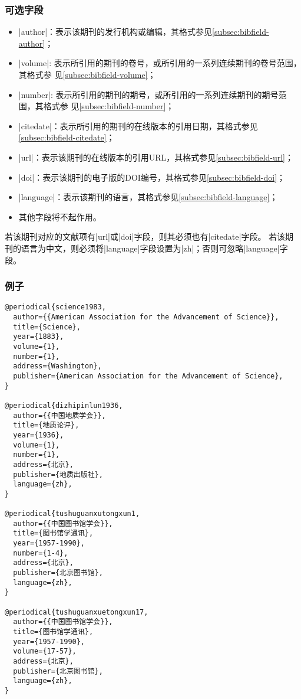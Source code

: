 \subsubsection{可选字段}

\begin{itemize}
\item |author|：表示该期刊的发行机构或编辑，其格式参见\ref{subsec:bibfield-author}；
\item |volume|: 表示所引用的期刊的卷号，或所引用的一系列连续期刊的卷号范围，其格式参
  见\ref{subsec:bibfield-volume}；
\item |number|: 表示所引用的期刊的期号，或所引用的一系列连续期刊的期号范围，其格式参
  见\ref{subsec:bibfield-number}；
\item |citedate|：表示所引用的期刊的在线版本的引用日期，其格式参见\ref{subsec:bibfield-citedate}；
\item |url|：表示该期刊的在线版本的引用URL，其格式参见\ref{subsec:bibfield-url}；
\item |doi|：表示该期刊的电子版的DOI编号，其格式参见\ref{subsec:bibfield-doi}；
\item |language|：表示该期刊的语言，其格式参见\ref{subsec:bibfield-language}；
\item 其他字段将不起作用。
\end{itemize}


\begin{note}
若该期刊对应的文献项有|url|或|doi|字段，则其必须也有|citedate|字段。
若该期刊的语言为中文，则必须将|language|字段设置为|zh|；否则可忽略|language|字段。
\end{note}

\subsubsection{例子}

\begin{verbatim}
@periodical{science1983,
  author={{American Association for the Advancement of Science}},
  title={Science},
  year={1883},
  volume={1},
  number={1},
  address={Washington},
  publisher={American Association for the Advancement of Science},
}

@periodical{dizhipinlun1936,
  author={{中国地质学会}},
  title={地质论评},
  year={1936},
  volume={1},
  number={1},
  address={北京},
  publisher={地质出版社},
  language={zh},
}

@periodical{tushuguanxutongxun1,
  author={{中国图书馆学会}},
  title={图书馆学通讯},
  year={1957-1990},
  number={1-4},
  address={北京},
  publisher={北京图书馆},
  language={zh},
}

@periodical{tushuguanxuetongxun17,
  author={{中国图书馆学会}},
  title={图书馆学通讯},
  year={1957-1990},
  volume={17-57},
  address={北京},
  publisher={北京图书馆},
  language={zh},
}
\end{verbatim}

